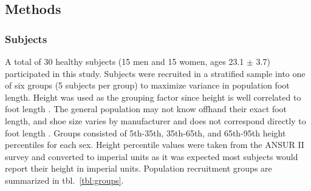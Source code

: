 \documentclass[defaultstyle,11pt]{comps}
\begin{document}
\hypertarget{methods-2}{%
\subsection{Methods}\label{methods-2}}

\hypertarget{subjects}{%
\subsubsection{Subjects}\label{subjects}}

A total of 30 healthy subjects (15 men and 15 women, ages 23.1 \(\pm\) 3.7) participated in this study.
Subjects were recruited in a stratified sample into one of six groups (5 subjects per group) to maximize variance in population foot length.
Height was used as the grouping factor since height is well correlated to foot length \citep{Giles1991}. The general population may not know offhand their exact foot length, and shoe size varies by manufacturer and does not correspond directly to foot length \citep{Jurca2013, Wannop2019}. Groups consisted of 5th-35th, 35th-65th, and 65th-95th height percentiles for each sex.
Height percentile values were taken from the ANSUR II survey \citep{Gordon2014} and converted to imperial units as it was expected most subjects would report their height in imperial units.
Population recruitment groups are summarized in tbl.~\ref{tbl:groups}.
\end{document}
